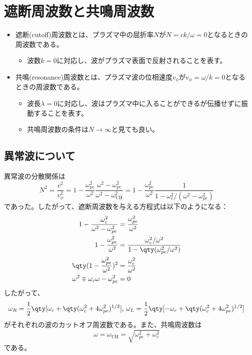 \newpage
\section{遮断周波数と共鳴周波数}
\begin{itemize}
	\item 遮断(cutoff)周波数とは、プラズマ中の屈折率$N$が$N=ck/\omega=0$となるときの周波数である。
	      \begin{itemize}
		      \item 波数$k=0$に対応し、波がプラズマ表面で反射されることを表す。
	      \end{itemize}
	\item 共鳴(resonance)周波数とは、プラズマ波の位相速度$v_{\phi}$が$v_{\phi}=\omega/k=0$となるときの周波数である。
	      \begin{itemize}
		      \item 波長$\lambda=0$に対応し、波はプラズマ中に入ることができるが伝播せずに振動することを表す。
		      \item 共鳴周波数の条件は$N\to\infty$と見ても良い。
	      \end{itemize}
\end{itemize}
\subsection{異常波について}
異常波の分散関係は
\begin{equation}
	N^2 = \frac{c^2}{v^2_{\phi}} = 1-\frac{\omega^2_{pe}}{\omega^2}\frac{\omega^2-\omega^2_{pe}}{\omega^2-\omega^2_{\text{UH}}}
	= 1-\frac{\omega^2_{pe}}{\omega^2}\frac{1}{1-\omega^2_c/(\omega^2-\omega^2_{pe})}
\end{equation}
であった。したがって、遮断周波数を与える方程式は以下のようになる：
\begin{align}
	1-\frac{\omega^2_c}{\omega^2-\omega^2_{pe}} & = \frac{\omega^2_{pe}}{\omega^2} \notag                             \\
	1-\frac{\omega^2_{pe}}{\omega^2}            & = \frac{\omega^2_c/\omega^2}{1-\qty(\omega^2_{pe}/\omega^2)} \notag \\
	\qty(1-\frac{\omega^2_{pe}}{\omega^2})^2    & = \frac{\omega^2_c}{\omega^2}                                \notag \\
	\omega^2 \mp \omega_c\omega -\omega^2_{pe}  & = 0
\end{align}
したがって、
\begin{equation}
	\omega_R = \frac{1}{2}\qty[\omega_c + \qty(\omega_c^2 + 4\omega_{pe}^2)^{1/2}],\,\omega_L =  \frac{1}{2}\qty[-\omega_c + \qty(\omega_c^2 + 4\omega_{pe}^2)^{1/2}]
\end{equation}
がそれぞれの波のカットオフ周波数である。また、共鳴周波数は
\begin{equation}
	\omega = \omega_{\text{UH}} = \sqrt{\omega^2_{pe} + \omega^2_c}
\end{equation}である。

